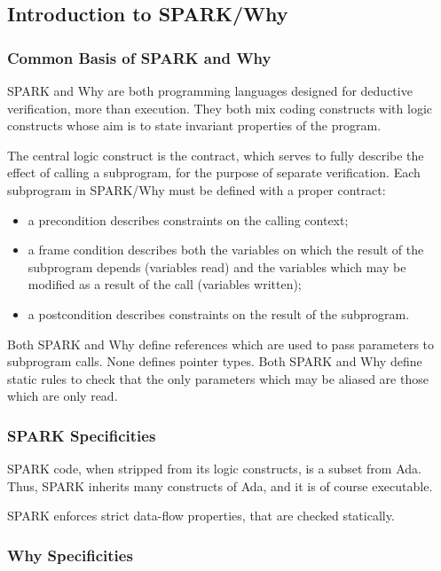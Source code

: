 \documentclass[fullpage]{article}
\begin{document}
\subsection{Introduction to SPARK/Why}

\subsubsection{Common Basis of SPARK and Why}

SPARK and Why are both programming languages designed for deductive
verification, more than execution. They both mix coding constructs with logic
constructs whose aim is to state invariant properties of the program.

The central logic construct is the contract, which serves to fully describe the
effect of calling a subprogram, for the purpose of separate verification. Each
subprogram in SPARK/Why must be defined with a proper contract:
\begin{itemize}
\item a precondition describes constraints on the calling context;
\item a frame condition describes both the variables on which the result of the
  subprogram depends (variables read) and the variables which may be modified
  as a result of the call (variables written);
\item a postcondition describes constraints on the result of the subprogram.
\end{itemize}

Both SPARK and Why define references which are used to pass parameters to
subprogram calls. None defines pointer types. Both SPARK and Why define static
rules to check that the only parameters which may be aliased are those which
are only read.

\subsubsection{SPARK Specificities}

SPARK code, when stripped from its logic constructs, is a subset from
Ada. Thus, SPARK inherits many constructs of Ada, and it is of course
executable.

SPARK enforces strict data-flow properties, that are checked statically.

\subsubsection{Why Specificities}
\end{document}

